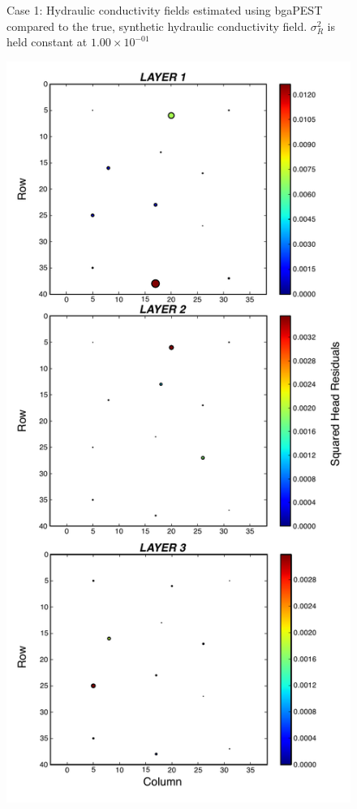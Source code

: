 \documentclass[11pt,oneside,onecolumn]{usgsreport}
\begin{document}
\begin{appendix}
\begin{figure}[!t]
\caption{\label{fig:3LK_case1}Case 1: Hydraulic conductivity fields estimated
using bgaPEST compared to the true, synthetic hydraulic conductivity
field. $\sigma_{R}^{2}$ is held constant at $1.00\times10^{-01}$}
\end{figure}


\begin{figure}[!t]
\begin{center}\includegraphics[scale=0.5]{figures/3L_resid_case1}\end{center}


\end{figure}
\end{appendix}
\end{document}
